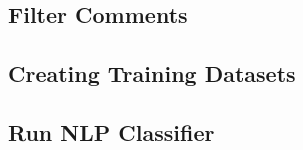 \subsection{Filter Comments} %
\label{sub:filter_comments}


\subsection{Creating Training Datasets} %
\label{sub:creating_training_datasets}

\subsection{Run NLP Classifier} %
\label{sub:run_nlp_classifier}

